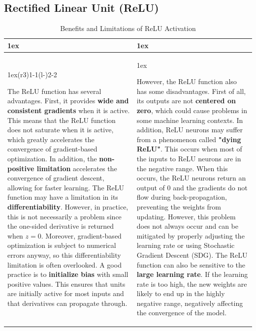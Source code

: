\subsection{Rectified Linear Unit (ReLU)}
\begin{table}[h]
\begin{tabularx}{\linewidth}{>{\parskip1ex}X@{\kern4\tabcolsep}>{\parskip1ex}X}
\toprule
\hfil\bfseries \color{mygreen!80!black}{Pros}
&
\hfil\bfseries \color{mygreen!80!black}{Cons}
\\\cmidrule(r{3\tabcolsep}){1-1}\cmidrule(l{-\tabcolsep}){2-2}

The ReLU function has several advantages. First, it provides \textbf{\textcolor{mygreen!80!black}{wide and consistent gradients}} when it is active. This means that the ReLU function does not saturate when it is active, which greatly accelerates the convergence of gradient-based optimization.
In addition, the \textbf{\textcolor{mygreen!80!black}{non-positive limitation}} accelerates the convergence of gradient descent, allowing for faster learning.
The ReLU function may have a limitation in its \textbf{\textcolor{mygreen!80!black}{differentiability}}. However, in practice, this is not necessarily a problem since the one-sided derivative is returned when \( z = 0 \). Moreover, gradient-based optimization is subject to numerical errors anyway, so this differentiability limitation is often overlooked.
A good practice is to \textbf{\textcolor{mygreen!80!black}{initialize bias}} with small positive values. This ensures that units are initially active for most inputs and that derivatives can propagate through.
&

However, the ReLU function also has some disadvantages. First of all, its outputs are not \textbf{\textcolor{mygreen!80!black}{centered on zero}}, which could cause problems in some machine learning contexts.
In addition, ReLU neurons may suffer from a phenomenon called \textbf{\textcolor{mygreen!80!black}{"dying ReLU"}}. This occurs when most of the inputs to ReLU neurons are in the negative range. When this occurs, the ReLU neurons return an output of $0$ and the gradients do not flow during back-propagation, preventing the weights from updating. However, this problem does not always occur and can be mitigated by properly adjusting the learning rate or using Stochastic Gradient Descent (SDG).
The ReLU function can also be sensitive to the \textbf{\textcolor{mygreen!80!black}{large learning rate}}. If the learning rate is too high, the new weights are likely to end up in the highly negative range, negatively affecting the convergence of the model.
\\\bottomrule
\end{tabularx}
\caption{Benefits and Limitations of ReLU Activation}
\end{table}

